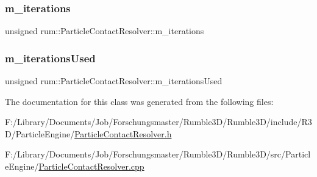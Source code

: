 \subsubsection{\texorpdfstring{m\+\_\+iterations}{m\_iterations}}
{\footnotesize\ttfamily unsigned rum\+::\+Particle\+Contact\+Resolver\+::m\+\_\+iterations\hspace{0.3cm}{\ttfamily [protected]}}

\mbox{\label{classrum_1_1_particle_contact_resolver_ab86206e4f42fb6da8b7e6337d393cfdf}} 
\subsubsection{\texorpdfstring{m\+\_\+iterations\+Used}{m\_iterationsUsed}}
{\footnotesize\ttfamily unsigned rum\+::\+Particle\+Contact\+Resolver\+::m\+\_\+iterations\+Used\hspace{0.3cm}{\ttfamily [protected]}}



The documentation for this class was generated from the following files\+:\begin{DoxyCompactItemize}
\item 
F\+:/\+Library/\+Documents/\+Job/\+Forschungsmaster/\+Rumble3\+D/\+Rumble3\+D/include/\+R3\+D/\+Particle\+Engine/\hyperlink{_particle_contact_resolver_8h}{Particle\+Contact\+Resolver.\+h}\item 
F\+:/\+Library/\+Documents/\+Job/\+Forschungsmaster/\+Rumble3\+D/\+Rumble3\+D/src/\+Particle\+Engine/\hyperlink{_particle_contact_resolver_8cpp}{Particle\+Contact\+Resolver.\+cpp}\end{DoxyCompactItemize}
